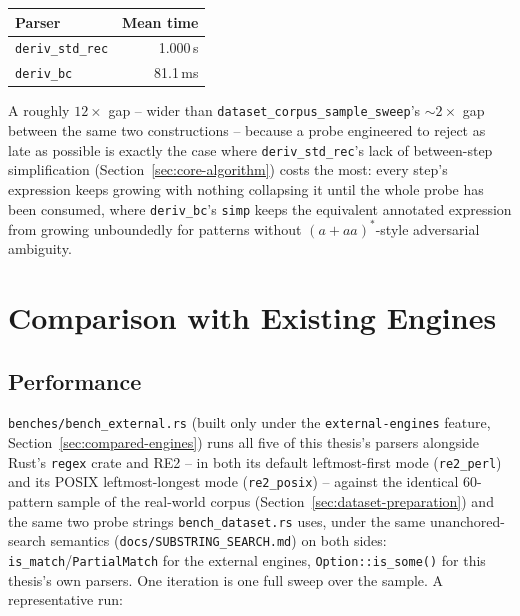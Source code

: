 \begin{center}
\begin{tabular}{lr}
\hline
Parser & Mean time \\
\hline
\texttt{deriv\_std\_rec} & 1.000\,s \\
\texttt{deriv\_bc} & 81.1\,ms \\
\hline
\end{tabular}
\end{center}

A roughly $12\times$ gap -- wider than \texttt{dataset\_corpus\_sample\_sweep}'s
$\sim\!2\times$ gap between the same two constructions -- because a
probe engineered to reject as late as possible is exactly the case where
\texttt{deriv\_std\_rec}'s lack of between-step simplification
(Section~\ref{sec:core-algorithm}) costs the most: every step's
expression keeps growing with nothing collapsing it until the whole
probe has been consumed, where \texttt{deriv\_bc}'s \texttt{simp} keeps
the equivalent annotated expression from growing unboundedly for
patterns without $(a+aa)^{*}$-style adversarial ambiguity.



\section{Comparison with Existing Engines}
\label{sec:comparison-existing-engines}

\subsection{Performance}
\label{sec:performance-comparison}

\texttt{benches/bench\_external.rs} (built only under the
\texttt{external-engines} feature, Section~\ref{sec:compared-engines})
runs all five of this thesis's parsers alongside Rust's \texttt{regex}
crate and RE2 -- in both its default leftmost-first mode
(\texttt{re2\_perl}) and its POSIX leftmost-longest mode
(\texttt{re2\_posix}) -- against the identical 60-pattern sample of the
real-world corpus (Section~\ref{sec:dataset-preparation}) and the same
two probe strings \texttt{bench\_dataset.rs} uses, under the same
unanchored-search semantics (\texttt{docs/SUBSTRING\_SEARCH.md}) on both
sides: \texttt{is\_match}/\texttt{PartialMatch} for the external engines,
\texttt{Option::is\_some()} for this thesis's own parsers. One iteration
is one full sweep over the sample. A representative run:

